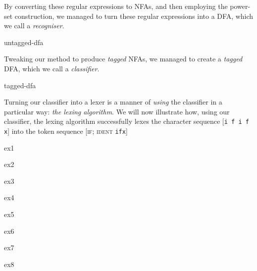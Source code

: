 By converting these regular expressions to NFAs, and then employing the power-set construction, we managed to turn these regular expressions into a DFA, which we call a \emph{recogniser}. 

\begin{center}
{untagged-dfa}
\end{center}

Tweaking our method to produce \emph{tagged} NFAs, we managed to create a \emph{tagged} DFA, which we call a \emph{classifier}.

\begin{center}
{tagged-dfa}
\end{center}

Turning our classifier into a lexer is a manner of \emph{using} the classifier in a particular way: \emph{the lexing algorithm}. We will now illustrate how, using our classifier, the lexing algorithm successfully lexes the character sequence [\texttt{i f  i f x}] into the token sequence [\textsc{if}; \textsc{ident} \texttt{ifx}]

\vspace{3mm}

\begin{minipage}{0.5\textwidth}
    {ex1}
\end{minipage}%
\begin{minipage}{0.5\textwidth}
    {ex2}
\end{minipage}

\begin{minipage}{0.5\textwidth}
    {ex3}
\end{minipage}%
\begin{minipage}{0.5\textwidth}
    {ex4}
\end{minipage}

\begin{minipage}{0.5\textwidth}
    {ex5}
\end{minipage}%
\begin{minipage}{0.5\textwidth}
    {ex6}
\end{minipage}

\begin{minipage}{0.5\textwidth}
    {ex7}
\end{minipage}%
\begin{minipage}{0.5\textwidth}
    {ex8}
\end{minipage}

